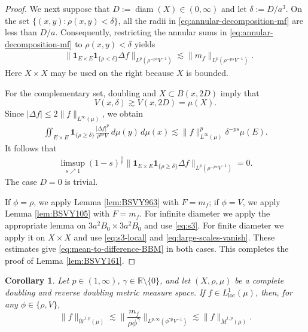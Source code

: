 \documentclass[11pt]{amsart}
\newtheorem{corollary}[theorem]{Corollary}
\theoremstyle{definition}
\theoremstyle{remark}
\numberwithin{equation}{section}
\newcommand{\Norm}[2]{\|#1\|_{#2}}
\begin{document}
\begin{proof}
We next suppose that $D:=\operatorname{diam}(X)\in(0,\infty)$ and let
$\delta:=D/a^3$.  On the set $\{(x,y):\rho(x,y)<\delta\}$, all the radii
in \eqref{eq:annular-decomposition-mf} are less than $D/a$.
Consequently, restricting the annular sums in
\eqref{eq:annular-decomposition-mf} to $\rho(x,y)<\delta$ yields
\begin{align}\label{eq:s3-local}
 &\Norm{\mathbf{1}_{E\times E}\mathbf{1}_{\{\rho<\delta\}}\Delta f}
 {L^p(\rho^{-ps}V^{-1})}
 \lesssim \Norm{m_f}{L^p(\rho^{-ps}V^{-1})}.
\end{align}
Here $X\times X$ may be used on the right because $X$ is bounded.

For the complementary set, doubling and
$X\subset B(x,2D)$ imply that
\begin{equation*}
 V(x,\delta)\gtrsim V(x,2D)=\mu(X).
\end{equation*}
Since $|\Delta f|\leq2\|f\|_{L^\infty(\mu)}$, we obtain
\begin{align*}
 \iint_{E\times E}\mathbf{1}_{\{\rho\geq\delta\}}
 \frac{|\Delta f|^p}{\rho^{ps}V}\,d\mu(y)\,d\mu(x)\lesssim
 \|f\|_{L^\infty(\mu)}^p\delta^{-ps}\mu(E).
\end{align*}
It follows that
\begin{align}\label{eq:large-scales-vanish}
 \limsup_{s\nearrow 1}(1-s)^{\frac1p}
 \Norm{\mathbf{1}_{E\times E}\mathbf{1}_{\{\rho\geq\delta\}}\Delta f}
 {L^p(\rho^{-ps}V^{-1})}=0.
\end{align}
The case $D=0$ is trivial.

If $\phi=\rho$, we apply Lemma \ref{lem:BSVY963} with $F=m_f$;
if $\phi=V$, we apply Lemma \ref{lem:BSVY105} with $F=m_f$.
For infinite diameter we apply the appropriate lemma on
$3a^2B_0\times3a^2B_0$ and use \eqref{eq:s3}.  For finite diameter we
apply it on $X\times X$ and use \eqref{eq:s3-local} and
\eqref{eq:large-scales-vanish}.  These estimates give
\eqref{eq:mean-to-difference-BBM} in both cases.
This completes the proof of Lemma \ref{lem:BSVY161}.
\end{proof}

\begin{corollary}\label{cor:mf-reverse-doubling}
Let $p\in(1,\infty)$, $\gamma\in\mathbb R\setminus\{0\}$, and let
$(X,\rho,\mu)$ be a complete doubling and reverse doubling metric measure
space. If $f\in L^1_{\mathrm{loc}}(\mu)$, then, for any
$\phi\in\{\rho,V\}$,
\begin{equation}\label{eq:mf-reverse-doubling}
 \Norm{f}{\dot W^{1,p}(\mu)}
 \lesssim
 \Big\|\frac{m_f}{\rho\phi^\gamma}\Big\|_
 {L^{p,\infty}(\phi^{\gamma p}V^{-1})}
 \lesssim
 \Norm{f}{\dot M^{1,p}(\mu)}.
\end{equation}
\end{corollary}
\end{document}

